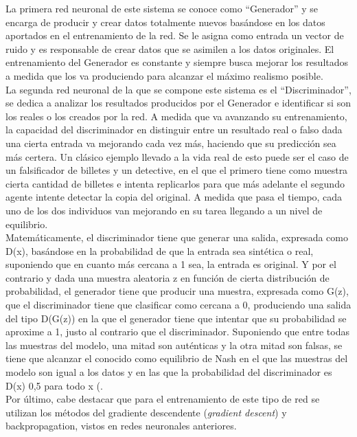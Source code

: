 La primera red neuronal de este sistema se conoce como “Generador” y se encarga de producir y crear datos totalmente nuevos basándose en los datos aportados en el entrenamiento de la red. Se le asigna como entrada un vector de ruido y es responsable de crear datos que se asimilen a los datos originales. El entrenamiento del Generador es constante y siempre busca mejorar los resultados a medida que los va produciendo para alcanzar el máximo realismo posible. \\

La segunda red neuronal de la que se compone este sistema es el “Discriminador”, se dedica a analizar los resultados producidos por el Generador e identificar si son los reales o los creados por la red. A medida que va avanzando su entrenamiento, la capacidad del discriminador en distinguir entre un resultado real o falso dada una cierta entrada va mejorando cada vez más, haciendo que su predicción sea más certera. 
Un clásico ejemplo llevado a la vida real de esto puede ser el caso de un falsificador de billetes y un detective, en el que el primero tiene como muestra cierta cantidad de billetes e intenta replicarlos para que más adelante el segundo agente intente detectar la copia del original. A medida que pasa el tiempo, cada uno de los dos individuos van mejorando en su tarea llegando a un nivel de equilibrio. \\

Matemáticamente, el discriminador tiene que generar una salida, expresada como D(x), basándose en la probabilidad de que la entrada sea sintética o real, suponiendo que en cuanto más cercana a 1 sea, la entrada es original. Y por el contrario y dada una muestra aleatoria z en función de cierta distribución de probabilidad, el generador tiene que producir una muestra, expresada como G(z), que el discriminador tiene que clasificar como cercana a 0, produciendo una salida del tipo D(G(z)) en la que el generador tiene que intentar que su probabilidad se aproxime a 1, justo al contrario que el discriminador. Suponiendo que entre todas las muestras del modelo, una mitad son auténticas y la otra mitad son falsas, se tiene que alcanzar el conocido como equilibrio de Nash en el que las muestras del modelo son igual a los datos y en las que la probabilidad del discriminador es D(x) 0,5 para todo x (\citep{berzalgan}. \\

Por último, cabe destacar que para el entrenamiento de este tipo de red se utilizan los métodos del gradiente descendente (\textit{gradient descent}) y backpropagation, vistos en redes neuronales anteriores. \\

